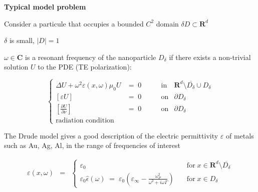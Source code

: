 \documentclass[mathserif,9pt]{beamer}
\def\R{\mathbf R}
\begin{document}
\begin{frame}
\small{
\textcolor{b_bruz}{\bf Typical model problem}
\medskip

Consider a particule that occupies a bounded  $C^2$ domain 
\textcolor{ox}{$\delta D \subset \R^d$}
\medskip 

$\delta$ is small, $|D| = 1$
\medskip

$\omega \in \mathbf{C}$ is a resonant frequency of the nanoparticle
$D_\delta$  if  there exists a  non-trivial solution $U$ to the PDE 
(TE polarization):
\medskip

\textcolor{ox}{
\[
\left\{ \begin{array}{llccc}
\Delta U +\omega^2 \varepsilon(x, \omega)\mu_0 U &= \;0
&\qquad \textrm{in}& \R^d \setminus \overline{D_\delta} \cup D_\delta
\\ 
\left[\varepsilon U\right] &=\; 0& 
\qquad \textrm{on}& \partial D_\delta
\\ 
\left[ \frac{\partial U}{\partial \nu}\right] &=\; 0& 
\qquad \textrm{on}& \partial D_\delta
\\
\textrm{radiation condition}
\end{array}\right.
\]}
\bigskip

The Drude model gives a good description of the electric permittivity $\varepsilon$
of metals such as Au, Ag, Al, in the range of frequencies of interest

\textcolor{ox}{
\begin{eqnarray*}
\varepsilon(x, \omega) &=& 
\left\{ \begin{array}{ll} 
\varepsilon_0 &\quad \textrm{for}\;x \in \R^d \setminus \overline{D_\delta}
\\
\varepsilon_0 \hat \epsilon(\omega) \;=\; 
\varepsilon_0\left(
\varepsilon_\infty - \frac{\omega_P^2}{\omega^2+i\omega \Gamma}
\right)
& \quad \textrm{for}\; x \in D_\delta
\end{array} \right.
\end{eqnarray*}}



}
\end{frame}
\end{document}
